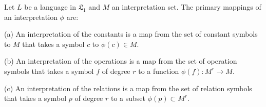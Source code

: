 Let $L$ be a language in $\mathfrak{L}_1$ and $M$ an interpretation set. The primary mappings of an interpretation $\phi$ are:

(a) An interpretation of the constants is a map from the set of constant symbols to $M$ that takes a symbol $c$ to $\phi(c) \in M$.

(b) An interpretation of the operations is a map from the set of operation symbols that takes a symbol $f$ of degree $r$ to a function $\phi(f) : M^r \to M$.

(c) An interpretation of the relations is a map from the set of relation symbols that takes a symbol $p$ of degree $r$ to a subset $\phi(p) \subset M^r$.
